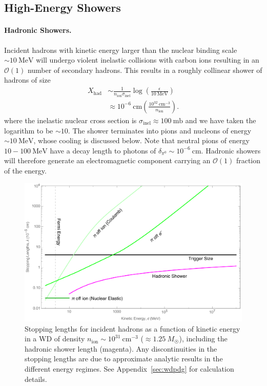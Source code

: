\documentclass[preprintnumbers,amsmath,amssymb,prd,superscriptaddress]{revtex4}
\newcommand{\OO}{\mathcal{O}}
\newcommand{\MeV}{\text{MeV}}
\newcommand{\ion}{\text{ion}}
\def\r{\right)}
\def\l{\left(}
\begin{document}
\subsection{High-Energy Showers}

\paragraph{Hadronic Showers.}
Incident hadrons with kinetic energy larger than the nuclear binding scale $\sim 10~\MeV$ will undergo violent inelastic collisions with carbon ions resulting in an $\OO(1)$ number of secondary hadrons.
This results in a roughly collinear shower of hadrons of size
\begin{align}
\label{eq:hadlength}
  X_\text{had} &\sim \frac{1}{n_\ion \sigma_\text{inel}} \log\l\frac{\epsilon}{10 ~\MeV}\r \\
  &\approx 10^{-6} ~\text{cm}
  \l\frac{10^{32}~\text{cm}^{-3}}{n_\text{ion}}\r. \nonumber
\end{align}
where the inelastic nuclear cross section is $\sigma_\text{inel} \approx 100 ~\text{mb}$ and we have taken the logarithm to be $\sim 10$.
The shower terminates into pions and nucleons of energy $\sim 10~\MeV$, whose cooling is discussed below.
Note that neutral pions of energy $10 - 100 ~\text{MeV}$ have a decay length to photons of $\delta_{\pi^0} \sim 10^{-6} ~\text{cm}$.
Hadronic showers will therefore generate an electromagnetic component carrying an $\OO(1)$ fraction of the energy.

\begin{figure}
\includegraphics[scale=.35]{SPhighHad.pdf}
\caption{Stopping lengths for incident hadrons as a function of kinetic energy in a WD of density $n_\text{ion} \sim 10^{31}~\text{cm}^{-3}$ ($\approx 1.25 ~M_{\astrosun}$), including the hadronic shower length (magenta).
Any discontinuities in the stopping lengths are due to approximate analytic results in the different energy regimes.
See Appendix~\ref{sec:wdpdg} for calculation details.
}
\label{fig:SPhighHad}
\end{figure}
\end{document}
